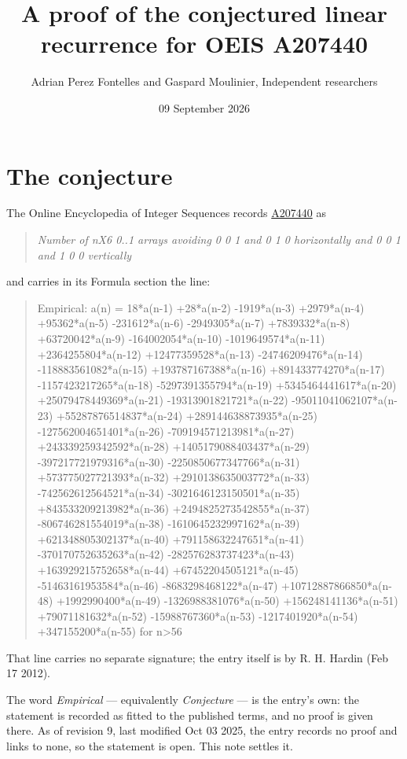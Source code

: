 \documentclass[11pt]{article}
\title{A proof of the conjectured linear recurrence for OEIS A207440}
\author{Adrian Perez Fontelles and Gaspard Moulinier, Independent researchers}
\date{09 September 2026}
\theoremstyle{definition}
\begin{document}
\maketitle
\section{The conjecture}

The Online Encyclopedia of Integer Sequences records \href{https://oeis.org/A207440}{A207440} as

\begin{quote}\itshape Number of nX6 0..1 arrays avoiding 0 0 1 and 0 1 0 horizontally and 0 0 1 and 1 0 0 vertically\end{quote}

and carries in its Formula section the line:

\begin{quote}\ttfamily Empirical: a(n) = 18*a(n-1) +28*a(n-2) -1919*a(n-3) +2979*a(n-4) +95362*a(n-5) -231612*a(n-6) -2949305*a(n-7) +7839332*a(n-8) +63720042*a(n-9) -164002054*a(n-10) -1019649574*a(n-11) +2364255804*a(n-12) +12477359528*a(n-13) -24746209476*a(n-14) -118883561082*a(n-15) +193787167388*a(n-16) +891433774270*a(n-17) -1157423217265*a(n-18) -5297391355794*a(n-19) +5345464441617*a(n-20) +25079478449369*a(n-21) -19313901821721*a(n-22) -95011041062107*a(n-23) +55287876514837*a(n-24) +289144638873935*a(n-25) -127562004651401*a(n-26) -709194571213981*a(n-27) +243339259342592*a(n-28) +1405179088403437*a(n-29) -397217721979316*a(n-30) -2250850677347766*a(n-31) +573775027721393*a(n-32) +2910138635003772*a(n-33) -742562612564521*a(n-34) -3021646123150501*a(n-35) +843533209213982*a(n-36) +2494825273542855*a(n-37) -806746281554019*a(n-38) -1610645232997162*a(n-39) +621348805302137*a(n-40) +791158632247651*a(n-41) -370170752635263*a(n-42) -282576283737423*a(n-43) +163929215752658*a(n-44) +67452204505121*a(n-45) -51463161953584*a(n-46) -8683298468122*a(n-47) +10712887866850*a(n-48) +1992990400*a(n-49) -1326988381076*a(n-50) +156248141136*a(n-51) +79071181632*a(n-52) -15988767360*a(n-53) -1217401920*a(n-54) +347155200*a(n-55) for n>56\end{quote}

That line carries no separate signature; the entry itself is by R. H. Hardin (Feb 17 2012).

The word {\itshape Empirical} --- equivalently {\itshape Conjecture} --- is the entry's own: the statement is recorded as fitted to the published terms, and no proof is given there. As of revision 9, last modified Oct 03 2025, the entry records no proof and links to none, so the statement is open. This note settles it.
\end{document}
